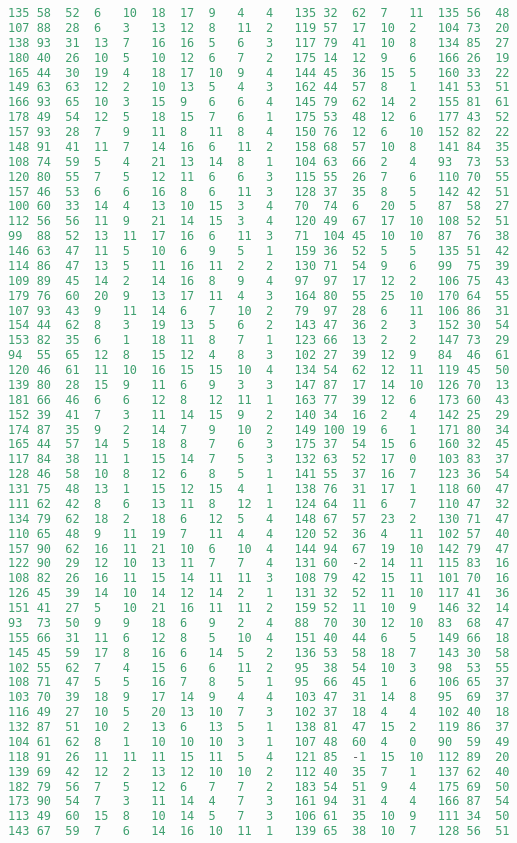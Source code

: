 \begin{lstlisting}[language=python]
135	58	52	6	10	18	17	9	4	4	135	32	62	7	11	135	56	48	1	0
107	88	28	6	3	13	12	8	11	2	119	57	17	10	2	104	73	20	-6	9
138	93	31	13	7	16	16	5	6	3	117	79	41	10	8	134	85	27	11	3
180	40	26	10	5	10	12	6	7	2	175	14	12	9	6	166	26	19	1	2
165	44	30	19	4	18	17	10	9	4	144	45	36	15	5	160	33	22	10	3
149	63	63	12	2	10	13	5	4	3	162	44	57	8	1	141	53	51	-1	9
166	93	65	10	3	15	9	6	6	4	145	79	62	14	2	155	81	61	-5	0
178	49	54	12	5	18	15	7	6	1	175	53	48	12	6	177	43	52	0	6
157	93	28	7	9	11	8	11	8	4	150	76	12	6	10	152	82	22	1	1
148	91	41	11	7	14	16	6	11	2	158	68	57	10	8	141	84	35	-3	1
108	74	59	5	4	21	13	14	8	1	104	63	66	2	4	93	73	53	1	10
120	80	55	7	5	12	11	6	6	3	115	55	26	7	6	110	70	55	6	4
157	46	53	6	6	16	8	6	11	3	128	37	35	8	5	142	42	51	-4	2
100	60	33	14	4	13	10	15	3	4	70	74	6	20	5	87	58	27	10	1
112	56	56	11	9	21	14	15	3	4	120	49	67	17	10	108	52	51	0	1
99	88	52	13	11	17	16	6	11	3	71	104	45	10	10	87	76	38	7	8
146	63	47	11	5	10	6	9	5	1	159	36	52	5	5	135	51	42	8	3
114	86	47	13	5	11	16	11	2	2	130	71	54	9	6	99	75	39	6	9
109	89	45	14	2	14	16	8	9	4	97	97	17	12	2	106	75	43	11	13
179	76	60	20	9	13	17	11	4	3	164	80	55	25	10	170	64	55	8	3
107	93	43	9	11	14	6	7	10	2	79	97	28	6	11	106	86	31	6	6
154	44	62	8	3	19	13	5	6	2	143	47	36	2	3	152	30	54	6	2
153	82	35	6	1	18	11	8	7	1	123	66	13	2	2	147	73	29	1	1
94	55	65	12	8	15	12	4	8	3	102	27	39	12	9	84	46	61	10	5
120	46	61	11	10	16	15	15	10	4	134	54	62	12	11	119	45	50	1	3
139	80	28	15	9	11	6	9	3	3	147	87	17	14	10	126	70	13	3	3
181	66	46	6	6	12	8	12	11	1	163	77	39	12	6	173	60	43	5	2
152	39	41	7	3	11	14	15	9	2	140	34	16	2	4	142	25	29	4	2
174	87	35	9	2	14	7	9	10	2	149	100	19	6	1	171	80	34	-5	1
165	44	57	14	5	18	8	7	6	3	175	37	54	15	6	160	32	45	0	0
117	84	38	11	1	15	14	7	5	3	132	63	52	17	0	103	83	37	7	14
128	46	58	10	8	12	6	8	5	1	141	55	37	16	7	123	36	54	-2	4
131	75	48	13	1	15	12	15	4	1	138	76	31	17	1	118	60	47	-2	7
111	62	42	8	6	13	11	8	12	1	124	64	11	6	7	110	47	32	-3	6
134	79	62	18	2	18	6	12	5	4	148	67	57	23	2	130	71	47	10	6
110	65	48	9	11	19	7	11	4	4	120	52	36	4	11	102	57	40	9	11
157	90	62	16	11	21	10	6	10	4	144	94	67	19	10	142	79	47	15	4
122	90	29	12	10	13	11	7	7	4	131	60	-2	14	11	115	83	16	9	2
108	82	26	16	11	15	14	11	11	3	108	79	42	15	11	101	70	16	7	0
126	45	39	14	10	14	12	14	2	1	131	32	52	11	10	117	41	36	6	5
151	41	27	5	10	21	16	11	11	2	159	52	11	10	9	146	32	14	3	5
93	73	50	9	9	18	6	9	2	4	88	70	30	12	10	83	68	47	6	8
155	66	31	11	6	12	8	5	10	4	151	40	44	6	5	149	66	18	-4	5
145	45	59	17	8	16	6	14	5	2	136	53	58	18	7	143	30	58	6	3
102	55	62	7	4	15	6	6	11	2	95	38	54	10	3	98	53	55	-1	4
108	71	47	5	5	16	7	8	5	1	95	66	45	1	6	106	65	37	3	5
103	70	39	18	9	17	14	9	4	4	103	47	31	14	8	95	69	37	5	8
116	49	27	10	5	20	13	10	7	3	102	37	18	4	4	102	40	18	4	1
132	87	51	10	2	13	6	13	5	1	138	81	47	15	2	119	86	37	-2	5
104	61	62	8	1	10	10	10	3	1	107	48	60	4	0	90	59	49	-2	14
118	91	26	11	11	11	15	11	5	4	121	85	-1	15	10	112	89	20	5	5
139	69	42	12	2	13	12	10	10	2	112	40	35	7	1	137	62	40	8	10
182	79	56	7	5	12	6	7	7	2	183	54	51	9	4	175	69	50	2	7
173	90	54	7	3	11	14	4	7	3	161	94	31	4	4	166	87	54	7	2
113	49	60	15	8	10	14	5	7	3	106	61	35	10	9	111	34	50	7	2
143	67	59	7	6	14	16	10	11	1	139	65	38	10	7	128	56	51	-1	3


\end{lstlisting}
